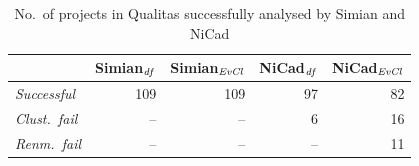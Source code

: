 \documentclass{sig-alternate-05-2015}
\begin{document}
\begin{table}[H]
	\centering
	\caption{No.~of projects in Qualitas successfully analysed by Simian and NiCad}
	\label{tab:projects_missing}
	\small
	\begin{tabular}{l|r|r|r|r}
		\hline
		& Simian$_{\textrm{\textit{df}}}$ & Simian$_{\textrm{\textit{EvCl}}}$  & NiCad$_{\textrm{\textit{df}}}$ & NiCad$_{\textrm{\textit{EvCl}}}$ \\ %
		\hline
		\textit{Successful} & 109 & 109 & 97 & 82 \\ %
		\textit{Clust.~fail} & -- & -- & 6 & 16 \\
		\textit{Renm.~fail} & -- &  -- & -- & 11 \\
		\hline

\end{tabular}
\end{table}
\end{document}
